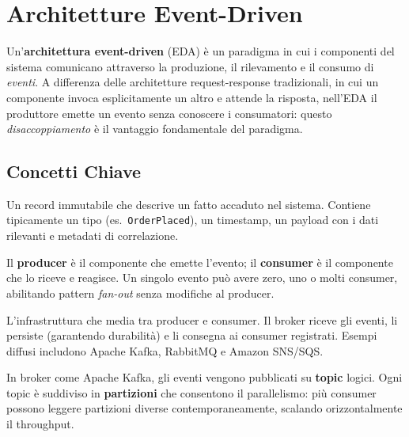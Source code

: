 \documentclass[12pt,a4paper]{report}
\begin{document}
\section{Architetture Event-Driven}

Un'\textbf{architettura event-driven} (EDA) è un paradigma in cui i componenti del
sistema comunicano attraverso la produzione, il rilevamento e il consumo di
\textit{eventi}. A differenza delle architetture request-response tradizionali, in
cui un componente invoca esplicitamente un altro e attende la risposta, nell'EDA
il produttore emette un evento senza conoscere i consumatori: questo
\textit{disaccoppiamento} è il vantaggio fondamentale del paradigma.

\subsection{Concetti Chiave}

\begin{description}[style=nextline, leftmargin=1.5cm]
  \item[\textsf{Evento}]
    Un record immutabile che descrive un fatto accaduto nel sistema.
    Contiene tipicamente un tipo (es.\ \texttt{OrderPlaced}), un timestamp, un
    payload con i dati rilevanti e metadati di correlazione.

  \item[\textsf{Producer e Consumer}]
    Il \textbf{producer} è il componente che emette l'evento; il \textbf{consumer}
    è il componente che lo riceve e reagisce. Un singolo evento può avere zero,
    uno o molti consumer, abilitando pattern \textit{fan-out} senza modifiche al
    producer.

  \item[\textsf{Broker / Message Bus}]
    L'infrastruttura che media tra producer e consumer. Il broker riceve gli eventi,
    li persiste (garantendo durabilità) e li consegna ai consumer registrati.
    Esempi diffusi includono Apache Kafka, RabbitMQ e Amazon SNS/SQS.

  \item[\textsf{Topic e Partizione}]
    In broker come Apache Kafka, gli eventi vengono pubblicati su \textbf{topic}
    logici. Ogni topic è suddiviso in \textbf{partizioni} che consentono il
    parallelismo: più consumer possono leggere partizioni diverse
    contemporaneamente, scalando orizzontalmente il throughput.
\end{description}
\end{document}
